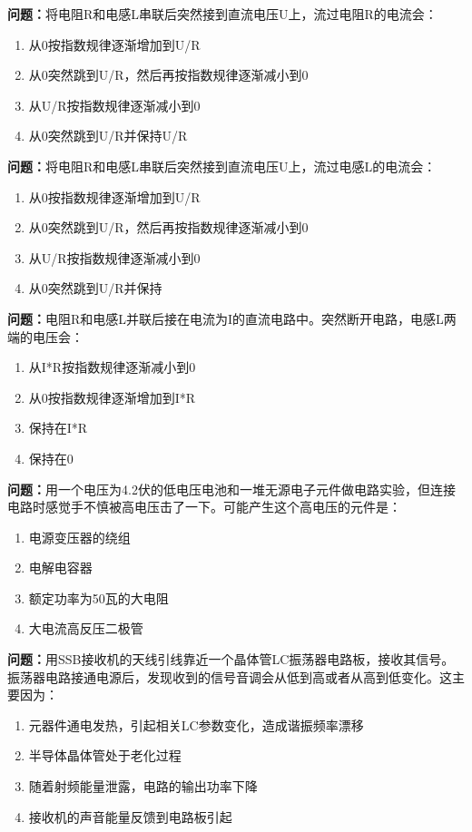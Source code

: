 \noindent\textbf{问题：}将电阻R和电感L串联后突然接到直流电压U上，流过电阻R的电流会：
\begin{enumerate}[label=\Alph*), leftmargin=3em]
\item 从0按指数规律逐渐增加到U/R
\item 从0突然跳到U/R，然后再按指数规律逐渐减小到0
\item 从U/R按指数规律逐渐减小到0
\item 从0突然跳到U/R并保持U/R
\end{enumerate}

\bigskip


\noindent\textbf{问题：}将电阻R和电感L串联后突然接到直流电压U上，流过电感L的电流会：
\begin{enumerate}[label=\Alph*), leftmargin=3em]
\item 从0按指数规律逐渐增加到U/R
\item 从0突然跳到U/R，然后再按指数规律逐渐减小到0
\item 从U/R按指数规律逐渐减小到0
\item 从0突然跳到U/R并保持
\end{enumerate}

\bigskip


\noindent\textbf{问题：}电阻R和电感L并联后接在电流为I的直流电路中。突然断开电路，电感L两端的电压会：
\begin{enumerate}[label=\Alph*), leftmargin=3em]
\item 从I*R按指数规律逐渐减小到0
\item 从0按指数规律逐渐增加到I*R
\item 保持在I*R
\item 保持在0
\end{enumerate}

\bigskip


\noindent\textbf{问题：}用一个电压为4.2伏的低电压电池和一堆无源电子元件做电路实验，但连接电路时感觉手不慎被高电压击了一下。可能产生这个高电压的元件是：
\begin{enumerate}[label=\Alph*), leftmargin=3em]
\item 电源变压器的绕组
\item 电解电容器
\item 额定功率为50瓦的大电阻
\item 大电流高反压二极管
\end{enumerate}

\bigskip


\noindent\textbf{问题：}用SSB接收机的天线引线靠近一个晶体管LC振荡器电路板，接收其信号。振荡器电路接通电源后，发现收到的信号音调会从低到高或者从高到低变化。这主要因为：
\begin{enumerate}[label=\Alph*), leftmargin=3em]
\item 元器件通电发热，引起相关LC参数变化，造成谐振频率漂移
\item 半导体晶体管处于老化过程
\item 随着射频能量泄露，电路的输出功率下降
\item 接收机的声音能量反馈到电路板引起
\end{enumerate}

